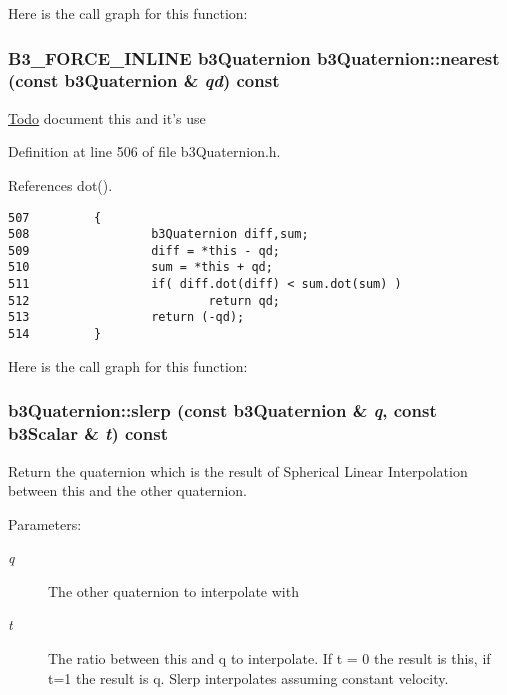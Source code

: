 Here is the call graph for this function:\hypertarget{classb3_quaternion_c257faeb2bf5a223870603face96f002}{
\subsubsection[nearest]{\setlength{\rightskip}{0pt plus 5cm}B3\_\-FORCE\_\-INLINE {\bf b3Quaternion} b3Quaternion::nearest (const {\bf b3Quaternion} \& {\em qd}) const}}
\label{classb3_quaternion_c257faeb2bf5a223870603face96f002}


\begin{Desc}
\item[\hyperlink{todo__todo000003}{Todo}]document this and it's use \end{Desc}


Definition at line 506 of file b3Quaternion.h.

References dot().

\begin{Code}\begin{verbatim}507         {
508                 b3Quaternion diff,sum;
509                 diff = *this - qd;
510                 sum = *this + qd;
511                 if( diff.dot(diff) < sum.dot(sum) )
512                         return qd;
513                 return (-qd);
514         }
\end{verbatim}
\end{Code}




Here is the call graph for this function:\hypertarget{classb3_quaternion_9b64bb67f4ece30723d963132478049c}{
\subsubsection[slerp]{ b3Quaternion::slerp (const {\bf b3Quaternion} \& {\em q}, \/  const b3Scalar \& {\em t}) const}}
\label{classb3_quaternion_9b64bb67f4ece30723d963132478049c}


Return the quaternion which is the result of Spherical Linear Interpolation between this and the other quaternion. 

\begin{Desc}
\item[Parameters:]
\begin{description}
\item[{\em q}]The other quaternion to interpolate with \item[{\em t}]The ratio between this and q to interpolate. If t = 0 the result is this, if t=1 the result is q. Slerp interpolates assuming constant velocity. \end{description}
\end{Desc}



